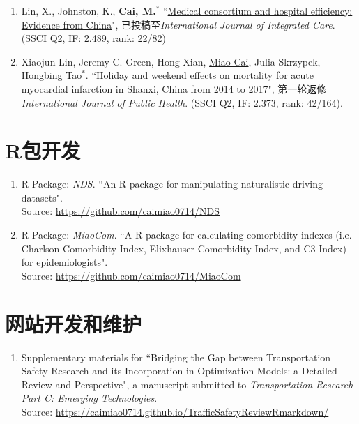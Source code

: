 \documentclass[11pt, a4paper]{article}
\newcommand{\years}[1]{\marginnote{\scriptsize #1}}
\begin{document}
\begin{enumerate}[leftmargin=0ex,itemsep=1ex]
		\item Lin, X., Johnston, K., \textbf{Cai, M.}$^*$ ``\ul{Medical consortium and hospital efficiency: Evidence from China}", 已投稿至\emph{International Journal of Integrated Care}. (SSCI Q2, IF: 2.489, rank: 22/82)
		
		\item Xiaojun Lin, Jeremy C. Green, Hong Xian, \underline{Miao Cai}, Julia Skrzypek, Hongbing Tao$^\ast$. ``Holiday and weekend effects on mortality for acute myocardial infarction in Shanxi, China from 2014 to 2017", 第一轮返修\emph{International Journal of Public Health}. (SSCI Q2, IF: 2.373, rank: 42/164).
	\end{enumerate}
	
	
	
	\section*{R包开发}
	\begin{enumerate}[leftmargin=0ex,itemsep=1ex]
		\item \years{2019}R Package: \emph{NDS}. ``An R package for manipulating naturalistic driving datasets".\\ Source: \href{https://github.com/caimiao0714/NDS}{https://github.com/caimiao0714/NDS}
		
		\item \years{2017}R Package: \emph{MiaoCom}. ``A R package for calculating comorbidity indexes (i.e. Charlson Comorbidity Index, Elixhauser Comorbidity Index, and C3 Index) for epidemiologists".\\ Source: \href{https://github.com/caimiao0714/MiaoCom}{https://github.com/caimiao0714/MiaoCom}
	\end{enumerate}
	
	\section*{网站开发和维护}
	\begin{enumerate}[leftmargin=0ex,itemsep=1ex]
		\item \years{2019}Supplementary materials for ``Bridging the Gap between Transportation Safety Research and its Incorporation in Optimization Models: a Detailed Review and Perspective", a manuscript submitted to \emph{Transportation Research Part C: Emerging Technologies}.\\ Source: \href{https://caimiao0714.github.io/TrafficSafetyReviewRmarkdown/}{https://caimiao0714.github.io/TrafficSafetyReviewRmarkdown/}
	\end{enumerate}
	
\end{document}
